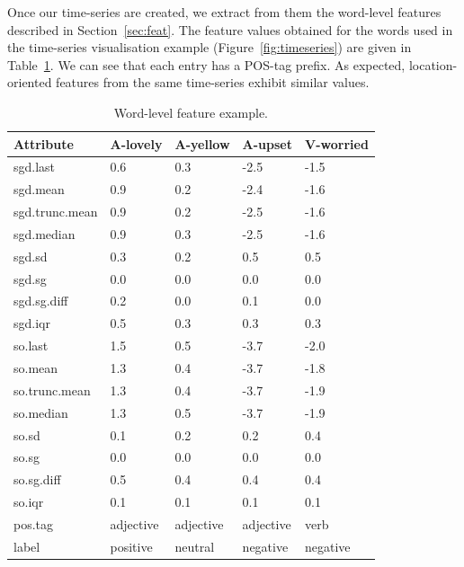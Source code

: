 \documentclass{sig-alternate}
\begin{document}
   
Once our time-series are created, we extract from them the word-level features described in Section~\ref{sec:feat}. The feature values obtained for the words used in the time-series visualisation example (Figure~\ref{fig:timeseries}) are given in Table~\ref{fig:featex}.  We can see that each entry has a POS-tag prefix.  As expected, location-oriented features from the same time-series exhibit similar values. %

\begin{table}[htb]
\scriptsize
\centering
\begin{tabular}{l|llll}
  \hline
Attribute & A-lovely & A-yellow & A-upset & V-worried \\ 
  \hline
sgd.last &  0.6 &  0.3 & -2.5 & -1.5 \\ 
  sgd.mean &  0.9 &  0.2 & -2.4 & -1.6 \\ 
  sgd.trunc.mean &  0.9 &  0.2 & -2.5 & -1.6 \\ 
  sgd.median &  0.9 &  0.3 & -2.5 & -1.6 \\ 
  sgd.sd & 0.3 & 0.2 & 0.5 & 0.5 \\ 
  sgd.sg & 0.0 & 0.0 & 0.0 & 0.0 \\ 
  sgd.sg.diff & 0.2 & 0.0 & 0.1 & 0.0 \\ 
  sgd.iqr & 0.5 & 0.3 & 0.3 & 0.3 \\ 
  so.last &  1.5 &  0.5 & -3.7 & -2.0 \\ 
  so.mean &  1.3 &  0.4 & -3.7 & -1.8 \\ 
  so.trunc.mean &  1.3 &  0.4 & -3.7 & -1.9 \\ 
  so.median &  1.3 &  0.5 & -3.7 & -1.9 \\ 
  so.sd & 0.1 & 0.2 & 0.2 & 0.4 \\ 
  so.sg & 0.0 & 0.0 & 0.0& 0.0 \\ 
  so.sg.diff & 0.5 & 0.4 & 0.4 & 0.4 \\ 
  so.iqr & 0.1 & 0.1 & 0.1 & 0.1 \\ 
  pos.tag & adjective & adjective & adjective & verb \\ \hline
  label & positive & neutral & negative & negative \\ 
   \hline
\end{tabular}
\caption{Word-level feature example.}
\label{fig:featex}
\end{table}
\end{document}
